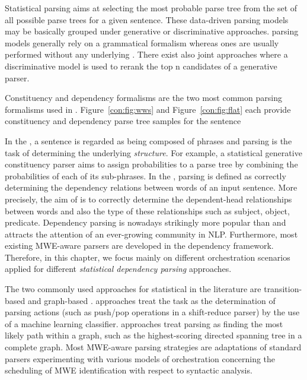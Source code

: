 \documentclass[output=paper]{langsci/langscibook}
\begin{document}
Statistical parsing aims at selecting the most probable parse tree from the set of all possible parse trees for a given sentence. 
These data-driven parsing models may be basically grouped under generative or discriminative approaches.
 parsing models generally rely on a grammatical formalism whereas  ones are usually performed without any underlying .
There exist also joint approaches where a discriminative model is used to rerank the top n candidates of a generative parser.

Constituency and dependency formalisms are the two most common parsing formalisms used in .
Figure~\ref{con:fig:wws} and Figure~\ref{con:fig:flat} each provide constituency and dependency parse tree samples
for the sentence  

In the , a sentence is regarded as being composed of phrases and parsing is the task of determining the underlying \emph{ structure}.
For example, a statistical generative constituency parser aims to assign probabilities to a parse tree by combining the probabilities of each of its sub-phrases.
In the , parsing is defined as correctly determining the dependency relations between words of an input sentence. More precisely,
the aim of  is to correctly determine the dependent-head relationships between words and also the type of these relationships such as subject, object, predicate.
Dependency parsing is nowadays strikingly more popular than  and attracts the attention of an ever-growing community in NLP.
Furthermore, most existing MWE-aware parsers are developed in the dependency framework.
Therefore, in this chapter, we focus mainly on different orchestration scenarios applied for different \emph{statistical dependency parsing} approaches.


The two commonly used approaches for statistical  in the literature are transition-based \citep{yamada2003statistical,nivre2007maltparser} and graph-based \citep{eisner1996three,mcdonald-lerman-pereira:2006:conll-x,nakagawa:2007:emnlp-conll2007}. 
 approaches treat the  task as the determination of parsing actions (such as push/pop operations in a shift-reduce parser) by the use of a machine learning classifier.  approaches treat parsing as finding the most likely path within a graph, such as the highest-scoring directed spanning tree in a complete graph. Most MWE-aware parsing strategies are adaptations of standard parsers experimenting with various models of orchestration concerning the scheduling of MWE identification with respect to syntactic analysis.
\end{document}
